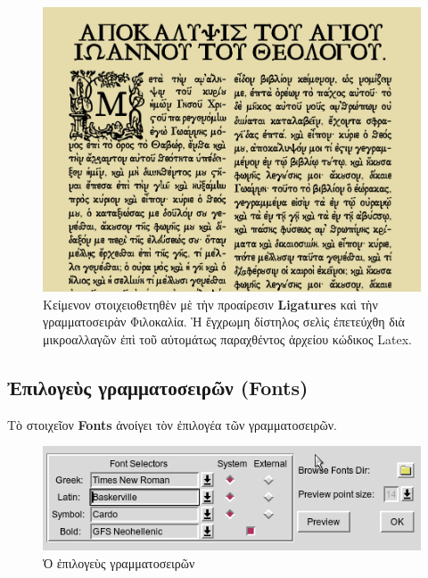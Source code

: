 \documentclass[12pt,a4paper]{article}
\begin{document}
    \begin{figure}[htb]
      \begin{center}
        \includegraphics[scale=0.3]{../images/apok.png}
        \caption{Κείμενον στοιχειοθετηθὲν μὲ τὴν
                   προαίρεσιν {\bf Ligatures} καὶ τὴν γραμματοσειρὰν
                   Φιλοκαλία. Ἡ ἔγχρωμη δίστηλος σελὶς ἐπετεύχθη
                   διὰ μικροαλλαγῶν ἐπὶ τοῦ αὐτομάτως παραχθέντος
                   ἀρχείου κώδικος Latex.}
      \end{center}
    \end{figure}
\newpage
  \subsection{Ἐπιλογεὺς γραμματοσειρῶν (Fonts)}
    Τὸ στοιχεῖον {\bf Fonts} ἀνοίγει τὸν ἐπιλογέα τῶν γραμματοσειρῶν.
      \begin{figure}[htb]
        \begin{center}
          \includegraphics[scale=0.6]{../images/font-selector.png}
          \caption{Ὁ ἐπιλογεὺς γραμματοσειρῶν}
        \end{center}
      \end{figure}
\end{document}

